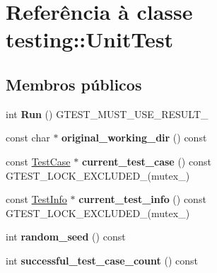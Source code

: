\hypertarget{classtesting_1_1UnitTest}{\section{Referência à classe testing\-:\-:Unit\-Test}
\label{classtesting_1_1UnitTest}
}
\subsection*{Membros públicos}
\begin{DoxyCompactItemize}
\item 
\hypertarget{classtesting_1_1UnitTest_a2febc800536b44500565f4c423f359d3}{int {\bfseries Run} () G\-T\-E\-S\-T\-\_\-\-M\-U\-S\-T\-\_\-\-U\-S\-E\-\_\-\-R\-E\-S\-U\-L\-T\-\_\-}\label{classtesting_1_1UnitTest_a2febc800536b44500565f4c423f359d3}

\item 
\hypertarget{classtesting_1_1UnitTest_a275c8d3b385106ee981f74980c34e99d}{const char $\ast$ {\bfseries original\-\_\-working\-\_\-dir} () const }\label{classtesting_1_1UnitTest_a275c8d3b385106ee981f74980c34e99d}

\item 
\hypertarget{classtesting_1_1UnitTest_a2bf61896036ae03edbd7bceed14f9e18}{const \hyperlink{classtesting_1_1TestCase}{Test\-Case} $\ast$ {\bfseries current\-\_\-test\-\_\-case} () const G\-T\-E\-S\-T\-\_\-\-L\-O\-C\-K\-\_\-\-E\-X\-C\-L\-U\-D\-E\-D\-\_\-(mutex\-\_\-)}\label{classtesting_1_1UnitTest_a2bf61896036ae03edbd7bceed14f9e18}

\item 
\hypertarget{classtesting_1_1UnitTest_a088eaf814a33085ace3d881d22e6bdea}{const \hyperlink{classtesting_1_1TestInfo}{Test\-Info} $\ast$ {\bfseries current\-\_\-test\-\_\-info} () const G\-T\-E\-S\-T\-\_\-\-L\-O\-C\-K\-\_\-\-E\-X\-C\-L\-U\-D\-E\-D\-\_\-(mutex\-\_\-)}\label{classtesting_1_1UnitTest_a088eaf814a33085ace3d881d22e6bdea}

\item 
\hypertarget{classtesting_1_1UnitTest_a6fa3161a230329e07fc31a339b682a20}{int {\bfseries random\-\_\-seed} () const }\label{classtesting_1_1UnitTest_a6fa3161a230329e07fc31a339b682a20}

\item 
\hypertarget{classtesting_1_1UnitTest_a1761c6274386032db8315156632eab6d}{int {\bfseries successful\-\_\-test\-\_\-case\-\_\-count} () const }\label{classtesting_1_1UnitTest_a1761c6274386032db8315156632eab6d}


\end{DoxyCompactItemize}
